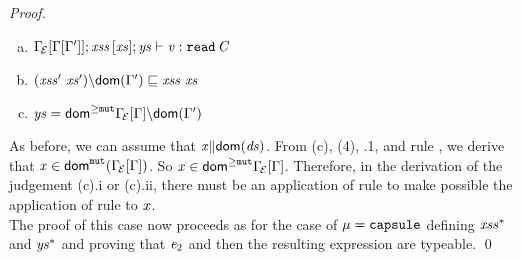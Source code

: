 {\begin{proof}
\begin{enumerate} [(a)]
\begin{enumerate}[i.]
\end{enumerate}
\item ${\Gamma_{\!{\cal{E}}}[\Gamma[\Gamma']]};\mathit{xss}\,[\mathit{xs}];\mathit{ys}\vdash \mathit{v}:\texttt{read}\,\mathit{C}$
\item $\LessEq{(\LentLocked'\ \xs'){\setminus}\dom{\Gamma'}}{\LentLocked\ \xs}$
\item $\mathit{ys}={\textsf{dom}^{\geq\texttt{mut}}}{\Gamma_{\!{\cal{E}}}[\Gamma]}{\setminus}\textsf{dom}(\Gamma')$
\end{enumerate}
As before, we can assume that  $\mathit{x}{\parallel}\textsf{dom}(\mathit{ds})$. From (c), (4), .1, and rule , we derive that $\mathit{x}\in\textsf{dom}^{\texttt{mut}}(\Gamma_{\!{\cal{E}}}[\Gamma])$. So $\mathit{x}\in{\textsf{dom}^{\geq\texttt{mut}}}{\Gamma_{\!{\cal{E}}}[\Gamma]}$.
Therefore, in the derivation of the judgement (c).i or (c).ii, there must be an application of rule  to make possible the
application of rule  to $\mathit{x}$.\\
The proof of this case now proceeds as for the case of $\mu=\texttt{capsule}$ defining $\mathit{xss}^{\ast}$ and $\mathit{ys}^{\ast}$ and proving that $\mathit{e}_2$ and then the resulting expression are typeable.
\qed
\end{proof}

}
